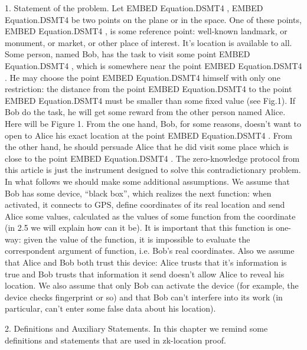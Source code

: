 \documentclass{article}
\begin{document}
1. Statement of the problem.
Let  EMBED Equation.DSMT4  ,  EMBED Equation.DSMT4   be two points on the plane or in the space.
One of these points,  EMBED Equation.DSMT4  , is some reference point: well-known landmark, or monument, or market, or other place of interest.
It’s location is available to all.
Some person, named Bob, has the task to visit some point  EMBED Equation.DSMT4  , which is somewhere near the point  EMBED Equation.DSMT4  .
He may choose the point  EMBED Equation.DSMT4   himself with only one restriction: the distance from the point  EMBED Equation.DSMT4   
to the point  EMBED Equation.DSMT4   must be smaller than some fixed value (see Fig.1).
If Bob do the task, he will get some reward from the other person named Alice.
Here will be Figure 1.
From the one hand, Bob, for some reasons, doesn’t want to open to Alice his exact location at the point  EMBED Equation.DSMT4  .
From the other hand, he should persuade Alice that he did visit some place which is close to the point  EMBED Equation.DSMT4  .
The zero-knowledge protocol from this article is just the instrument designed to solve this contradictionary problem.
In what follows we should make some additional assumptions.
We assume that Bob has some device, “black box”, which realizes the next function: when activated, it connects to GPS,
define coordinates of its real location and send Alice some values, calculated as the values of some function from the coordinate (in 2.5 we will explain how can it be).
It is important that this function is one-way: given the value of the function, it is impossible to evaluate the correspondent argument of function, i.e. Bob’s real coordinates.
Also we assume that Alice and Bob both trust this device: Alice trusts that it’s information is true and Bob trusts that information it send doesn’t allow Alice to reveal his location.
We also assume that only Bob can activate the device (for example, the device checks fingerprint or so) and that Bob can’t interfere into its work (in particular,
can’t enter some false data about his location).

2. Definitions and Auxiliary Statements.
In this chapter we remind some definitions and statements that are used in zk-location proof.
\end{document}
